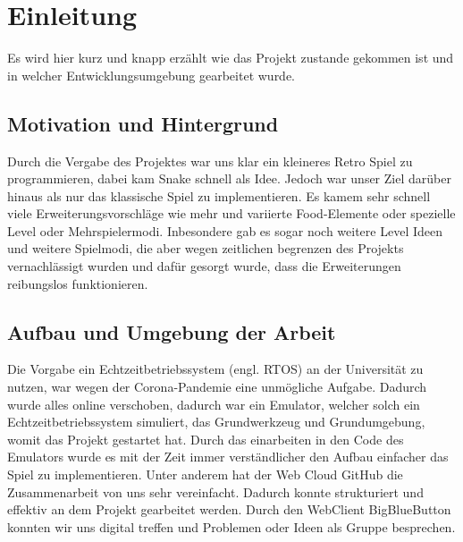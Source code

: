 
\chapter{Einleitung}
\label{Einleitung}

Es wird hier kurz und knapp erz{\"a}hlt wie das Projekt zustande gekommen ist und in welcher Entwicklungsumgebung gearbeitet wurde.

\section{Motivation und Hintergrund}
\label{Motivation_und_Hintergrund}
%
Durch die Vergabe des Projektes war uns klar ein kleineres Retro Spiel zu programmieren, dabei kam Snake schnell als Idee. Jedoch war unser Ziel dar{\"u}ber hinaus als nur das klassische Spiel zu implementieren. Es kamem sehr schnell viele Erweiterungsvorschl{\"a}ge wie mehr und variierte Food-Elemente oder spezielle Level oder Mehrspielermodi. Inbesondere gab es sogar noch weitere Level Ideen und weitere Spielmodi, die aber wegen zeitlichen begrenzen des Projekts vernachl{\"a}ssigt wurden und daf{\"u}r gesorgt wurde, dass die Erweiterungen reibungslos funktionieren.


\section{Aufbau und Umgebung der Arbeit}
\label{Aufbau_und_Umgebung_der_Arbeit}
%
Die Vorgabe ein Echtzeitbetriebssystem (engl. RTOS) an der Universit{\"a}t zu nutzen, war wegen der Corona-Pandemie eine unm{\"o}gliche Aufgabe. Dadurch wurde alles online verschoben, dadurch war ein Emulator, welcher solch ein Echtzeitbetriebssystem simuliert, das Grundwerkzeug und Grundumgebung, womit das Projekt gestartet hat. Durch das einarbeiten in den Code des Emulators wurde es mit der Zeit immer verst{\"a}ndlicher den Aufbau einfacher das Spiel zu implementieren. Unter anderem hat der Web Cloud GitHub die Zusammenarbeit von uns sehr vereinfacht. Dadurch konnte strukturiert und effektiv an dem Projekt gearbeitet werden. Durch den WebClient BigBlueButton konnten wir uns digital treffen und Problemen oder Ideen als Gruppe besprechen. 
